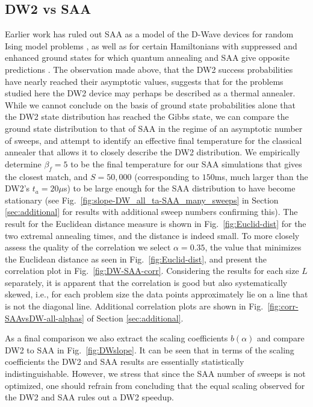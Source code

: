 \subsection{DW2 vs SAA}
Earlier work has ruled out SAA as a model of the D-Wave devices for random Ising model problems \cite{q108}, as well as for certain Hamiltonians with suppressed and enhanced ground states for which quantum annealing and SAA give opposite predictions \cite{q-sig,q-sig2}. The observation made above, that the DW2 success probabilities have nearly reached their asymptotic values, suggests that for the problems studied here the DW2 device may perhaps be described as a thermal annealer. While we cannot conclude on the basis of ground state probabilities alone that the DW2 state distribution has reached the Gibbs state, we can compare the ground state distribution to that of SAA in the regime of an asymptotic number of sweeps, and attempt to identify an effective final temperature for the classical annealer that allows it to closely describe the DW2 distribution. We empirically determine $\beta_f=5$ to be the final temperature for our SAA simulations that gives the closest match, and $S=50,\!000$ (corresponding to $150$ms, much larger than the DW2's $t_a = 20\mu$s) to be large enough for the SAA distribution to have become stationary (see Fig.~\ref{fig:slope-DW_all_ta-SAA_many_sweeps} in Section \ref{sec:additional} for results with additional sweep numbers confirming this). The result for the Euclidean distance measure is shown in Fig.~\ref{fig:Euclid-dist} for the two extremal annealing times, and the distance is indeed small. To more closely assess the quality of the correlation we select $\alpha=0.35$, the value that minimizes the Euclidean distance as seen in Fig.~\ref{fig:Euclid-dist}, and present the correlation plot in Fig.~\ref{fig:DW-SAA-corr}. Considering the results for each size $L$ separately, it is apparent that the correlation is good but also systematically skewed, i.e., for each problem size the data points approximately lie on a line that is not the diagonal line. Additional correlation plots are shown in Fig.~\ref{fig:corr-SAAvsDW-all-alphas} of Section \ref{sec:additional}.

As a final comparison we also extract the scaling coefficients $b(\alpha)$ and compare DW2 to SAA in Fig.~\ref{fig:DWslope}. It can be seen that in terms of the scaling coefficients the DW2 and SAA results are essentially statistically indistinguishable. However, we stress that since the SAA number of sweeps is not optimized, one should refrain from concluding that the equal scaling observed for the DW2 and SAA rules out a DW2 speedup.

